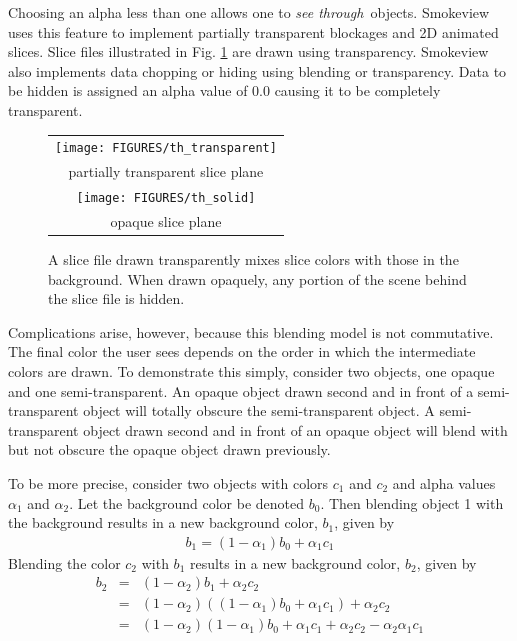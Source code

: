\documentclass[11pt,twoside]{book}
\begin{document}
Choosing an alpha less than one allows one to {\em see through}\
objects. Smokeview uses this feature to implement partially
transparent blockages and 2D animated slices. Slice files
illustrated in Fig. \ref{figtransparent} are drawn using
transparency. Smokeview also implements data chopping or hiding
using blending or transparency.  Data to be hidden is assigned an
alpha value of 0.0 causing it to be completely transparent.

\begin{figure}[\figoptions]
\begin{center}
\begin{tabular}{c}
\texttt{[image: FIGURES/th\_transparent]}\\
partially transparent slice plane\\
\texttt{[image: FIGURES/th\_solid]}\\
opaque slice plane\\
\end{tabular}
\end{center}
\caption {A slice file drawn transparently mixes
slice colors with those in the background.  When drawn opaquely,
any portion of the scene behind the slice file is hidden. }
\label{figtransparent}
\end{figure}

Complications arise, however, because this blending model is not
commutative.  The final color the user sees depends on the order
in which the intermediate colors are drawn. To demonstrate this
simply, consider two objects, one opaque and one semi-transparent.
An opaque object drawn second and in front of a semi-transparent
object will totally obscure the semi-transparent object. A
semi-transparent object drawn second and in front of an opaque
object will blend with but not obscure the opaque object drawn
previously.

To be more precise, consider two objects with colors $c_1$ and
$c_2$ and alpha values $\alpha_1$ and $\alpha_2$.   Let the
background color be denoted $b_0$.  Then blending object 1 with
the background results in a new background color, $b_1$, given by
\begin{eqnarray}
b_1=(1-\alpha_1)b_0 + \alpha_1c_1
\end{eqnarray}
Blending the color $c_2$ with $b_1$ results in a new background color, $b_2$, given by
\begin{eqnarray}
b_2&=&(1-\alpha_2)b_1 + \alpha_2c_2\\
&=&(1-\alpha_2)((1-\alpha_1)b_0 + \alpha_1c_1)+\alpha_2c_2\\
&=&(1-\alpha_2)(1-\alpha_1)b_0 + \alpha_1c_1 + \alpha_2c_2 - \alpha_2\alpha_1c_1
\end{eqnarray}
\end{document}
